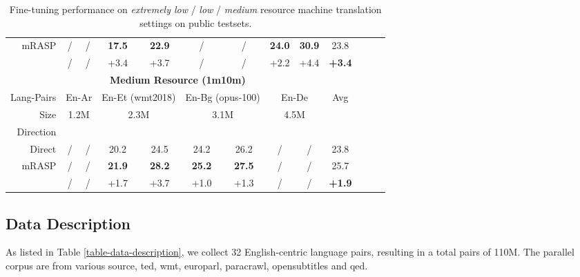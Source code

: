 \documentclass[11pt,a4paper]{article}
\newcommand{\mf}[1]{\multicolumn{2}{c}{ #1}}
\newcommand{\smf}[1]{\multicolumn{2}{c}{#1}}
\newcommand{\method}{mRASP\xspace}
\newcommand{\baseline}{Direct}
\begin{document}
\begin{table*}[htb]
\begin{center}
\begin{tabular}{rcccccccccccc}
 \method &
/ & / &  \bf 17.5 & \bf 22.9 & / & / & \bf 24.0 & \bf 30.9 & 23.8

\\

 &
/ & / &
+3.4 & +3.7  &
/ & / &
+2.2 & +4.4 &
\textbf{+3.4}

\\

\midrule
\midrule
&\multicolumn{7}{c}{\textbf{Medium Resource (1m10m)}} \\
\midrule


Lang-Pairs & 
\mf{En-Ar} &
\mf{En-Et (wmt2018)} &
\mf{En-Bg (opus-100)} &
\mf{En-De} &
Avg
\\



Size &
\smf{1.2M}  & \smf{2.3M} & \smf{3.1M} & \smf{4.5M}  

\\


Direction & 
  & &

  & &

  & &

  & \\



\midrule
 \baseline &
/ & / & 20.2 & 24.5 & 24.2 & 26.2 & / & / &  23.8
\\


 \method &
/ & / & \bf 21.9 & \bf 28.2 & \bf 25.2 & \bf 27.5 & / & / & 25.7
\\

 &
/ & / &
+1.7 & +3.7 &
+1.0 & +1.3 &
/ & / &
\textbf{+1.9}

\\

\bottomrule
\end{tabular}
\caption{Fine-tuning performance on \emph{extremely low} / \emph{low} / \emph{medium} resource machine translation settings on public testsets.}
\label{tab:LowRpub}
\end{center}
\end{table*} 

\subsection{Data Description}
As listed in Table \ref{table-data-description}, we collect 32 English-centric language pairs, resulting in a total pairs of 110M. The parallel corpus are from various source, ted, wmt,
europarl, paracrawl, opensubtitles and qed.
\end{document}
